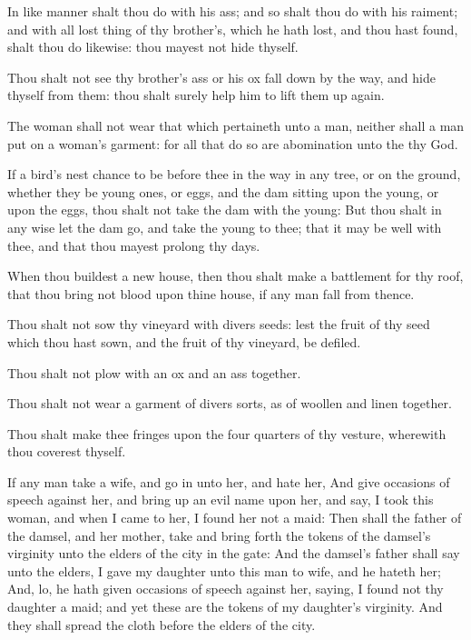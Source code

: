 \verse In like manner shalt thou do with his ass; and so shalt thou do with his raiment; and with all lost thing of thy brother's, which he hath lost, and thou hast found, shalt thou do likewise: thou mayest not hide thyself.

\verse Thou shalt not see thy brother's ass or his ox fall down by the way, and hide thyself from them: thou shalt surely help him to lift them up again.

\verse The woman shall not wear that which pertaineth unto a man, neither shall a man put on a woman's garment: for all that do so are abomination unto the \LORD thy God.

\verse If a bird's nest chance to be before thee in the way in any tree, or on the ground, whether they be young ones, or eggs, and the dam sitting upon the young, or upon the eggs, thou shalt not take the dam with the young: \verse But thou shalt in any wise let the dam go, and take the young to thee; that it may be well with thee, and that thou mayest prolong thy days.

\verse When thou buildest a new house, then thou shalt make a battlement for thy roof, that thou bring not blood upon thine house, if any man fall from thence.

\verse Thou shalt not sow thy vineyard with divers seeds: lest the fruit of thy seed which thou hast sown, and the fruit of thy vineyard, be defiled.

\verse Thou shalt not plow with an ox and an ass together.

\verse Thou shalt not wear a garment of divers sorts, as of woollen and linen together.

\verse Thou shalt make thee fringes upon the four quarters of thy vesture, wherewith thou coverest thyself.

\verse If any man take a wife, and go in unto her, and hate her, \verse And give occasions of speech against her, and bring up an evil name upon her, and say, I took this woman, and when I came to her, I found her not a maid: \verse Then shall the father of the damsel, and her mother, take and bring forth the tokens of the damsel's virginity unto the elders of the city in the gate: \verse And the damsel's father shall say unto the elders, I gave my daughter unto this man to wife, and he hateth her; \verse And, lo, he hath given occasions of speech against her, saying, I found not thy daughter a maid; and yet these are the tokens of my daughter's virginity. And they shall spread the cloth before the elders of the city.

